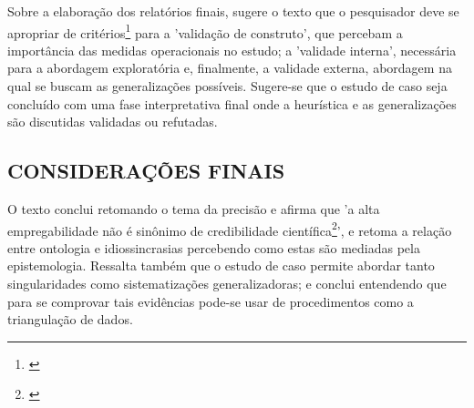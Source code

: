 \documentclass[
   article,       %
   12pt,          %
   oneside,       %
   a4paper,       %
   english,       %
   brazil,           %
   sumario=tradicional
   ]{abntex2}
\begin{document}
Sobre a elaboração dos relatórios finais, sugere o texto que o pesquisador deve se apropriar de critérios\footnote{\cite[p.181]{cap_6_ontologia}} para a 'validação de construto', que percebam a importância das medidas operacionais no estudo; a 'validade interna', necessária para a abordagem exploratória e, finalmente, a validade externa, abordagem na qual se buscam as generalizações possíveis. Sugere-se que o estudo de caso seja concluído com uma fase interpretativa final onde a heurística e as generalizações são discutidas validadas ou refutadas.


\subsection{CONSIDERAÇÕES FINAIS}

O texto conclui retomando o tema da precisão e afirma que 'a alta
empregabilidade não é sinônimo de credibilidade científica\footnote{\cite[p.182]{cap_6_ontologia}}', e retoma a relação entre ontologia e idiossincrasias percebendo como estas são mediadas pela epistemologia. Ressalta também que o estudo de caso permite abordar tanto singularidades como sistematizações generalizadoras; e conclui entendendo que para se comprovar tais evidências pode-se usar de procedimentos como a triangulação de dados.


\postextual


\end{document}
